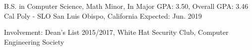 


\begin{cventries}


\cventry
{B.S. in Computer Science, Math Minor, In Major GPA: 3.50, Overall GPA: 3.46} %
{Cal Poly - SLO} %
{San Luis Obispo, California} %
{Expected: Jun. 2019} %
{ %
\begin{cvitems}
\item {Involvement: Dean's List 2015/2017, White Hat Security Club, Computer Engineering Society }
\end{cvitems}
}


\end{cventries}
